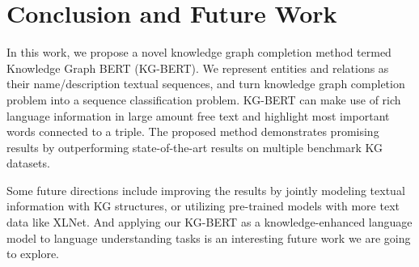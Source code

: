 \documentclass[letterpaper]{article} \usepackage{aaai20}  \usepackage{times}  \usepackage{helvet} \usepackage{courier}  \usepackage[hyphens]{url}  \usepackage{graphicx} \urlstyle{rm} \def\UrlFont{\rm}  \usepackage{graphicx}  \usepackage{amsmath}
\begin{document}
 
 \section{Conclusion and Future Work}
 In this work, we propose a novel knowledge graph completion method termed Knowledge Graph BERT (KG-BERT). We represent entities and relations as their name/description textual sequences, and turn knowledge graph completion problem into a sequence classification problem. KG-BERT can make use of rich language information in large amount free text and highlight most important words connected to a triple. The proposed method demonstrates promising results by outperforming state-of-the-art results on multiple benchmark KG datasets.
 
 Some future directions include improving the results by jointly modeling textual information with KG structures, or utilizing pre-trained models with more text data like XLNet. And applying our KG-BERT as a knowledge-enhanced language model to language understanding tasks is an interesting future work we are going to explore.






\end{document}
